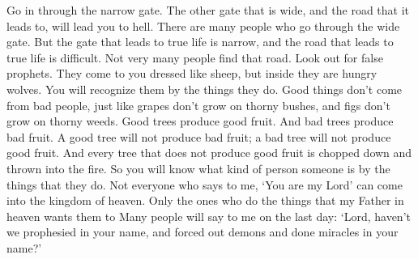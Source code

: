 \bverse \iffalse Enter ye in at the strait gate; for wide is the gate, and broad is the way, which leadeth to destruction, and many there be who go in thereat; \fi
Go in through the narrow gate. The other gate that is wide, and the road that it leads to, will lead you to hell. There are many people who go through the wide gate.
\bverse \iffalse Because strait is the gate, and narrow is the way, which leadeth unto life, and few there be that find it. \fi
But the gate that leads to true life is narrow, and the road that leads to true life is difficult. Not very many people find that road.
\bverse \iffalse Beware of false prophets, who come to you in sheep's clothing, but inwardly they are ravening wolves. \fi
Look out for false prophets. They come to you dressed like sheep, but inside they are hungry wolves.
\bverse \iffalse Ye shall know them by their fruits. Do men gather grapes of thorns, or figs of thistles? \fi
You will recognize them by the things they do. Good things don't come from bad people, just like grapes don't grow on thorny bushes, and figs don't grow on thorny weeds.
\bverse \iffalse Even so every good tree bringeth forth good fruit; but a corrupt tree bringeth forth evil fruit. \fi
Good trees produce good fruit. And bad trees produce bad fruit.
\bverse \iffalse A good tree cannot bring forth evil fruit, neither a corrupt tree bring forth good fruit. \fi
A good tree will not produce bad fruit; a bad tree will not produce good fruit.
\bverse \iffalse Every tree that bringeth not forth good fruit is hewn down, and cast into the fire. \fi
And every tree that does not produce good fruit is chopped down and thrown into the fire.
\bverse \iffalse Wherefore, by their fruits ye shall know them. \fi
So you will know what kind of person someone is by the things that they do.
\bverse \iffalse Not every one that saith unto me, Lord, Lord, shall enter into the kingdom of heaven; but he that doeth the will of my Father who is in heaven. \fi
Not everyone who says to me, \lq You are my Lord\rq{} can come into the kingdom of heaven. Only the ones who do the things that my Father in heaven wants them to
\bverse \iffalse Many will say to me in that day: Lord, Lord, have we not prophesied in thy name, and in thy name have cast out devils, and in thy name done many wonderful works? \fi
Many people will say to me on the last day: \lq Lord, haven't we prophesied in your name, and forced out demons and done miracles in your name?\rq

